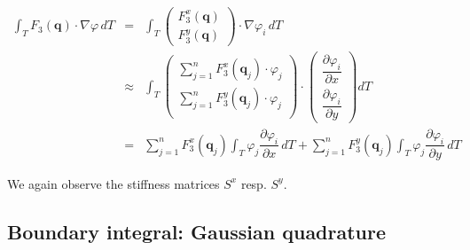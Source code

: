 \documentclass[a4paper, twoside]{article}
\newcommand{\pd}[2]{\dfrac{\partial #1}{\partial #2}}
\renewcommand{\phi}{\varphi}
\begin{document}
\begin{eqnarray*}
  \int_T F_3\left(\mathbf{q}\right) \cdot \nabla \phi \, dT & = &
  \int_T
  \begin{pmatrix}
    F_3^x(\mathbf{q}) \\ F_3^y(\mathbf{q})
  \end{pmatrix}
  \cdot \nabla \phi_i \, dT \\
  & \approx & \int_T
  \begin{pmatrix}
    \sum_{j=1}^n F_3^x(\mathbf{q}_j)\cdot \phi_j \\
    \sum_{j=1}^n F_3^y(\mathbf{q}_j)\cdot \phi_j \\
  \end{pmatrix}
  \cdot
  \begin{pmatrix}
    \pd{\phi_i}{x} \\
    \pd{\phi_i}{y}
  \end{pmatrix} dT \\
  & = & \sum_{j=1}^n F_3^x(\mathbf{q}_j) \int_T \phi_j \pd{\phi_i}{x} \, dT
  {} + \sum_{j=1}^n F_3^y(\mathbf{q}_j) \int_T \phi_j \pd{\phi_i}{y} \, dT
\end{eqnarray*}

We again observe the stiffness matrices $S^x$ resp. $S^y$.

\subsection{Boundary integral: Gaussian quadrature}
\label{sec:boundary-integral}
\end{document}
